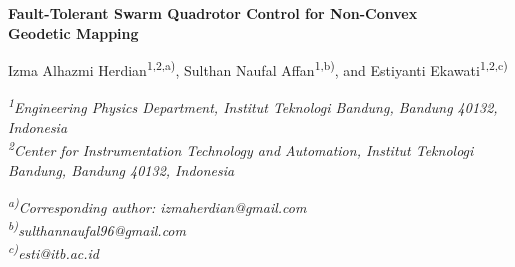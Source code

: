 \documentclass[10pt,letterpaper]{article}
\begin{document}
\begin{center}
    {\fontsize{18}{22}\selectfont\bfseries
        Fault-Tolerant Swarm Quadrotor Control for Non-Convex\\
        Geodetic Mapping\par}

    \vspace{2.0ex}

    {\fontsize{14}{17}\selectfont
        Izma Alhazmi Herdian\textsuperscript{1,2,a)},
        Sulthan Naufal Affan\textsuperscript{1,b)}, and
        Estiyanti Ekawati\textsuperscript{1,2,c)}\par}

    \vspace{1.5ex}

    {\fontsize{10}{12}\selectfont\itshape
        \textsuperscript{1}Engineering Physics Department, Institut Teknologi Bandung,
        Bandung 40132, Indonesia\\
        \textsuperscript{2}Center for Instrumentation Technology and Automation,
        Institut Teknologi Bandung, Bandung 40132, Indonesia\par}

    \vspace{1.5ex}

    {\fontsize{10}{12}\selectfont\itshape
        \textsuperscript{a)}Corresponding author: izmaherdian@gmail.com\\
        \textsuperscript{b)}sulthannaufal96@gmail.com\\
        \textsuperscript{c)}esti@itb.ac.id\par}
\end{center}

\vspace{1.5ex}
\end{document}

